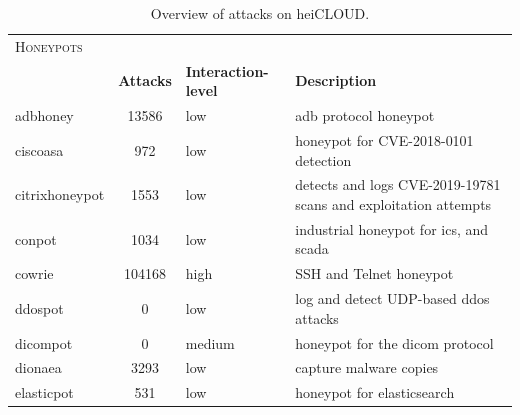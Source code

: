 \begin{table}
    \centering
    \caption[Overview of attacks on heiCLOUD]{Overview of attacks on heiCLOUD.}
    \begin{tabularx}{\linewidth}{l|clX}
        \toprule
        \textsc{Honeypots}                       & \multicolumn{3}{c}{}                                                                                                                     \\
                                                 & \textbf{Attacks}     & \textbf{Interaction-level} & \textbf{Description}                                                                 \\
        \hline
        adbhoney \cite{adbhoney2021}             & 13586                & low                        & \ac{adb} protocol honeypot                                                           \\
        ciscoasa \cite{cymmetria2018}            & 972                  & low                        & honeypot for CVE-2018-0101\cite{CVE-2018-0101} detection                             \\
        citrixhoneypot \cite{citrixhoneypot2020} & 1553                 & low                        & detects and logs CVE-2019-19781\cite{CVE-2019-19781} scans and exploitation attempts \\
        conpot \cite{conpot2021}                 & 1034                 & low                        & industrial honeypot for \ac{ics}, and \ac{scada}                                     \\
        cowrie \cite{cowire2021}                 & 104168               & high                       & SSH and Telnet honeypot                                                              \\
        ddospot \cite{ddosspot2021}              & 0                    & low                        & log and detect UDP-based \ac{ddos} attacks                                           \\
        dicompot \cite{dicompot2021}             & 0                    & medium                     & honeypot for the \ac{dicom} protocol                                                 \\
        dionaea \cite{dionaea2021}               & 3293                 & low                        & capture malware copies                                                               \\
        elasticpot \cite{elasticpot2021}         & 531                  & low                        & honeypot for elasticsearch                                                           \\

\end{tabularx}
\end{table}
